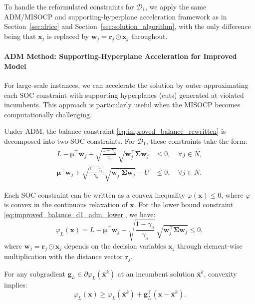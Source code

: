 \documentclass[preprint,12pt,authoryear]{elsarticle}
\begin{document}
To handle the reformulated constraints for $\mathcal{D}_1$, we apply the same ADM/MISOCP and supporting-hyperplane acceleration framework as in Section~\ref{sec:dricc} and Section~\ref{sec:solution_algorithm}, with the only difference being that $\mathbf{x}_j$ is replaced by $\mathbf{w}_j = \mathbf{r}_j \odot \mathbf{x}_j$ throughout.

\paragraph{ADM Method: Supporting-Hyperplane Acceleration for Improved Model}
For large-scale instances, we can accelerate the solution by outer-approximating each SOC constraint with supporting hyperplanes (cuts) generated at violated incumbents. This approach is particularly useful when the MISOCP becomes computationally challenging.

Under ADM, the balance constraint \eqref{eq:improved_balance_rewritten} is decomposed into two SOC constraints. For $\mathcal{D}_1$, these constraints take the form:
\begin{align}
L - \boldsymbol{\mu}^\top \mathbf{w}_j + \sqrt{\frac{1 - \gamma_a}{\gamma_a}} \, \sqrt{\mathbf{w}_j^\top \boldsymbol{\Sigma} \mathbf{w}_j} &\leqslant 0, \quad \forall j \in N, \label{eq:improved_balance_d1_adm_lower} \\
\boldsymbol{\mu}^\top \mathbf{w}_j + \sqrt{\frac{1 - \gamma_b}{\gamma_b}} \, \sqrt{\mathbf{w}_j^\top \boldsymbol{\Sigma} \mathbf{w}_j} - U &\leqslant 0, \quad \forall j \in N. \label{eq:improved_balance_d1_adm_upper}
\end{align}

Each SOC constraint can be written as a convex inequality $\varphi(\mathbf{x}) \leqslant 0$, where $\varphi$ is convex in the continuous relaxation of $\mathbf{x}$. For the lower bound constraint \eqref{eq:improved_balance_d1_adm_lower}, we have:
\begin{equation}
\varphi_L(\mathbf{x}) = L - \boldsymbol{\mu}^\top \mathbf{w}_j + \sqrt{\frac{1 - \gamma_a}{\gamma_a}} \, \sqrt{\mathbf{w}_j^\top \boldsymbol{\Sigma} \mathbf{w}_j} \leqslant 0,
\label{eq:improved_phi_L}
\end{equation}
where $\mathbf{w}_j = \mathbf{r}_j \odot \mathbf{x}_j$ depends on the decision variables $\mathbf{x}_j$ through element-wise multiplication with the distance vector $\mathbf{r}_j$.

For any subgradient $\mathbf{g}_L \in \partial \varphi_L(\bar{\mathbf{x}}^k)$ at an incumbent solution $\bar{\mathbf{x}}^k$, convexity implies:
\begin{equation}
\varphi_L(\mathbf{x}) \geqslant \varphi_L(\bar{\mathbf{x}}^k) + \mathbf{g}_L^\top (\mathbf{x} - \bar{\mathbf{x}}^k).
\end{equation}
\end{document}
